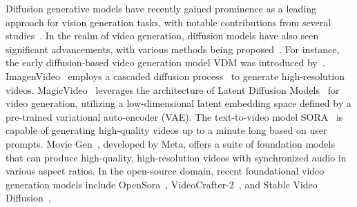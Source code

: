 Diffusion generative models have recently gained prominence as a leading approach for vision generation tasks, with notable contributions from several studies~\citep{sohl2015deep, song2019generative, ho2020denoising, song2021scorebased, ruiz2024lane}. In the realm of video generation, diffusion models have also seen significant advancements, with various methods being proposed~\cite{videoworldsimulators2024, polyak2024movie, opensora2024, chen2024videocrafter2, blattmann2023stable, jta+22, jwc+22, arh+23, yca+23, xyg+24, rma+23, zhou2023magicvideoefficientvideogeneration}. For instance, the early diffusion-based video generation model VDM was introduced by~\cite{jta+22}. ImagenVideo~\cite{jwc+22} employs a cascaded diffusion process~\cite{ho2022cascaded} to generate high-resolution videos. MagicVideo~\cite{zhou2023magicvideoefficientvideogeneration} leverages the architecture of Latent Diffusion Models~\cite{rombach2022high} for video generation, utilizing a low-dimensional latent embedding space defined by a pre-trained variational auto-encoder (VAE). The text-to-video model SORA~\cite{videoworldsimulators2024} is capable of generating high-quality videos up to a minute long based on user prompts. Movie Gen~\cite{polyak2024movie}, developed by Meta, offers a suite of foundation models that can produce high-quality, high-resolution videos with synchronized audio in various aspect ratios. In the open-source domain, recent foundational video generation models include OpenSora~\cite{opensora2024}, VideoCrafter-2~\cite{chen2024videocrafter2}, and Stable Video Diffusion~\cite{blattmann2023stable}.

